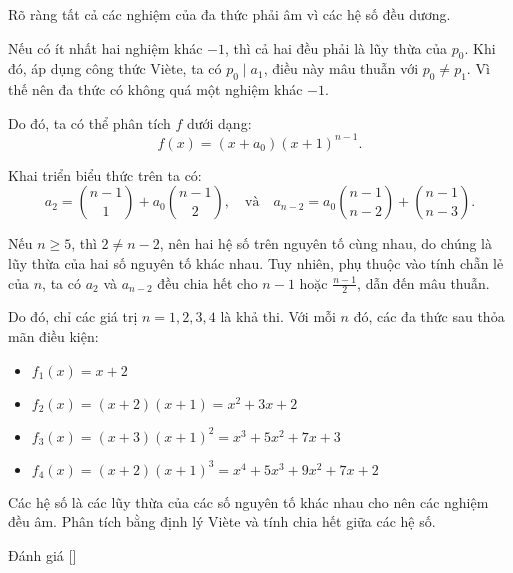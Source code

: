 \ifshowproblemandsoln
\ifshowproblem{}
\fi

\ifshowsoln
\begin{soln}\footnotemark
    Rõ ràng tất cả các nghiệm của đa thức phải âm vì các hệ số đều dương.
    
    Nếu có ít nhất hai nghiệm khác \( -1 \), thì cả hai đều phải là lũy thừa của \( p_0 \).
    Khi đó, áp dụng công thức Viète, ta có \( p_0 \mid a_1 \), điều này mâu thuẫn với $p_0 \ne p_1$.
    Vì thế nên đa thức có không quá một nghiệm khác \( -1 \).

    Do đó, ta có thể phân tích \( f \) dưới dạng:
    \[
        f(x) = (x + a_0)(x + 1)^{n - 1}.
    \]

    Khai triển biểu thức trên ta có:
    \[
        a_2 = \binom{n - 1}{1} + a_0 \binom{n - 1}{2}, \quad \text{và} \quad a_{n - 2} = a_0 \binom{n - 1}{n - 2} + \binom{n - 1}{n - 3}.
    \]

    Nếu \( n \ge 5 \), thì \( 2 \ne n - 2 \), nên hai hệ số trên nguyên tố cùng nhau, do chúng là lũy thừa của hai số nguyên tố khác nhau.
    Tuy nhiên, phụ thuộc vào tính chẵn lẻ của \( n \), ta có \( a_2 \) và \( a_{n - 2} \) đều chia hết cho \( n - 1 \) hoặc \( \frac{n - 1}{2} \), dẫn đến mâu thuẫn.

    Do đó, chỉ các giá trị \( n = 1, 2, 3, 4 \) là khả thi. Với mỗi \( n \) đó, các đa thức sau thỏa mãn điều kiện:
    \begin{itemize}[topsep=0pt, itemsep=0pt]
        \item \( f_1(x) = x + 2 \)
        \item \( f_2(x) = (x + 2)(x + 1) = x^2 + 3x + 2 \)
        \item \( f_3(x) = (x + 3)(x + 1)^2 = x^3 + 5x^2 + 7x + 3 \)
        \item \( f_4(x) = (x + 2)(x + 1)^3 = x^4 + 5x^3 + 9x^2 + 7x + 2 \)
    \end{itemize}
\end{soln}
\fi

\ifshowhint
\begin{hint*}
    Các hệ số là các lũy thừa của các số nguyên tố khác nhau cho nên các nghiệm đều âm. Phân tích bằng định lý Viète và tính chia hết giữa các hệ số.
\end{hint*}
\fi

\ifshowremark
\begin{remark*}
    Đánh giá [\textbf{}]
\end{remark*}
\newpage
\fi
